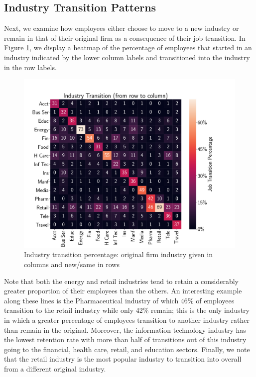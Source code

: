 \documentclass[10pt]{article}
\begin{document}
\subsection{Industry Transition Patterns}
\hspace{\parindent}
Next, we examine how employees either choose to move to a new industry or remain
in that of their original firm as a consequence of their job transition.  
In Figure \ref{fig:transmat}, we display a heatmap of the percentage of 
employees that started in an industry indicated by the lower column labels and 
transitioned into the industry in the row labels. 
%
\begin{figure}[thb]
    \centering
	\includegraphics[width=1.0\linewidth]{transmat.pdf}
	\caption{Industry transition percentage: original firm 
   industry given in columns and new/same in rows}
	\label{fig:transmat}
\end{figure}
%
Note that both the energy and retail industries tend to retain a considerably 
greater proportion of their employees than the others.  An interesting example 
along these lines is the Pharmaceutical industry of which 46\% of employees 
transition to the retail industry while only 42\% remain; this is the only industry in which 
a greater percentage of employees transition to another industry rather than 
remain in the original.  Moreover, the information technology industry has 
the lowest retention rate with more than half of transitions out of this industry 
going to the financial, health care, retail, and education sectors.  
Finally, we note that the retail industry is the most popular industry to transition 
into overall from a different original industry.
\end{document}
